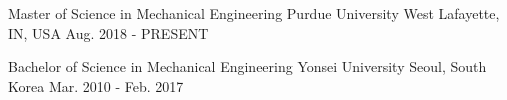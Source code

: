 


\begin{cventries}


\cvedu
{Master of Science in Mechanical Engineering} %
{Purdue University} %
{West Lafayette, IN, USA} %
{Aug. 2018 - PRESENT} %

\cvedu
{Bachelor of Science in Mechanical Engineering} %
{Yonsei University} %
{Seoul, South Korea} %
{Mar. 2010 - Feb. 2017} %

\end{cventries}